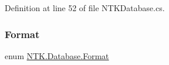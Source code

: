 Definition at line 52 of file N\+T\+K\+Database.\+cs.

\mbox{\label{namespace_n_t_k_1_1_database_a9bed700210ca4ed5854002637b664789}} 
\subsubsection{\texorpdfstring{Format}{Format}}
{\footnotesize\ttfamily enum \mbox{\hyperlink{namespace_n_t_k_1_1_database_a9bed700210ca4ed5854002637b664789}{N\+T\+K.\+Database.\+Format}}\hspace{0.3cm}{\ttfamily [strong]}}





